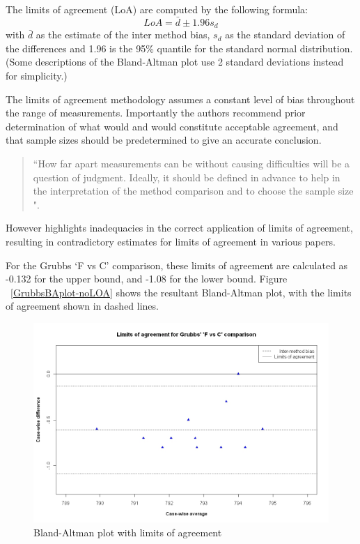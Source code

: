 \documentclass[12pt, a4paper]{report}
\theoremstyle{plain}
\theoremstyle{definition}
\theoremstyle{remark}
\begin{document}
The limits of agreement (LoA) are computed by the following
formula:
\[
LoA = \bar{d} \pm 1.96 s_{d}
\]
with $\bar{d}$ as the estimate of the inter method bias, $s_{d}$
as the standard deviation of the differences and 1.96 is the 95\%
quantile for the standard normal distribution. (Some descriptions of the
Bland-Altman plot use 2 standard deviations instead
for simplicity.)

The limits of agreement methodology assumes a constant level of bias throughout the range of measurements. Importantly the authors recommend prior determination of what would and would constitute acceptable
agreement, and that sample sizes should be predetermined to give an accurate conclusion. 

\begin{quote}
	``How far apart measurements can be without causing difficulties
	will be a question of judgment. Ideally, it should be defined in
	advance to help in the interpretation of the method comparison and
	to choose the sample size \citep{BA86}".
\end{quote}

However \citet{mantha} highlights inadequacies in the correct application of limits of agreement, resulting in contradictory estimates for limits of agreement in various papers.

For the Grubbs `F vs C' comparison, these limits
of agreement are calculated as -0.132 for the upper bound, and
-1.08 for the lower bound. Figure ~\ref{GrubbsBAplot-noLOA} shows the resultant
Bland-Altman plot, with the limits of agreement shown in dashed
lines.


\begin{figure}[h!]
	\begin{center}
		\includegraphics[width=125mm]{images/GrubbsBAplot-LOA.jpeg}
		\caption{Bland-Altman plot with limits of agreement}
	\end{center}
\end{figure}
\newpage
\end{document}
